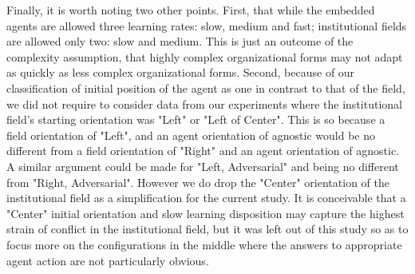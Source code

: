 \documentclass[12pt]{article}
\begin{document}
\noindent Finally, it is worth noting two other points. First, that while the embedded agents are allowed three learning rates: slow, medium and fast; institutional fields are allowed only two: slow and medium. This is just an outcome of the complexity assumption,  that highly complex organizational forms may not adapt as quickly as less complex organizational forms. Second, because of our classification of initial position of the agent as one in contrast to that of the field, we did not require to consider data from our experiments where the institutional field's starting orientation was "Left" or "Left of Center". This is so because a field orientation of "Left", and an agent orientation of agnostic would be no different from a field orientation of "Right" and an agent orientation of agnostic. A similar argument could be made for "Left, Adversarial" and being no different from "Right, Adversarial". However we do drop the "Center" orientation of the institutional field as a simplification for the current study. It is conceivable that a "Center" initial orientation and slow learning disposition may capture the highest strain of conflict in the institutional field, but it was left out of this study so as to focus more on the configurations in the middle where the answers to appropriate agent action are not particularly obvious.\\\\
\end{document}
